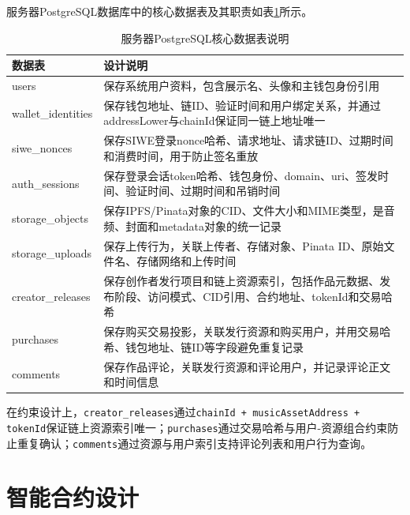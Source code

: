 服务器PostgreSQL数据库中的核心数据表及其职责如表\ref{tab:server_postgresql_tables}所示。

\begin{table}[htbp]
    \linespread{1.5}
    \songti
    \centering
    \caption{服务器PostgreSQL核心数据表说明}\label{tab:server_postgresql_tables}
    \begin{tabular}{|l|p{10cm}|}
        \hline
        数据表                & 设计说明                                                       \\ \hline
        users              & 保存系统用户资料，包含展示名、头像和主钱包身份引用                                  \\ \hline
        wallet\_identities & 保存钱包地址、链ID、验证时间和用户绑定关系，并通过addressLower与chainId保证同一链上地址唯一   \\ \hline
        siwe\_nonces       & 保存SIWE登录nonce哈希、请求地址、请求链ID、过期时间和消费时间，用于防止签名重放              \\ \hline
        auth\_sessions     & 保存登录会话token哈希、钱包身份、domain、uri、签发时间、验证时间、过期时间和吊销时间          \\ \hline
        storage\_objects   & 保存IPFS/Pinata对象的CID、文件大小和MIME类型，是音频、封面和metadata对象的统一记录     \\ \hline
        storage\_uploads   & 保存上传行为，关联上传者、存储对象、Pinata ID、原始文件名、存储网络和上传时间                \\ \hline
        creator\_releases  & 保存创作者发行项目和链上资源索引，包括作品元数据、发布阶段、访问模式、CID引用、合约地址、tokenId和交易哈希 \\ \hline
        purchases          & 保存购买交易投影，关联发行资源和购买用户，并用交易哈希、钱包地址、链ID等字段避免重复记录              \\ \hline
        comments           & 保存作品评论，关联发行资源和评论用户，并记录评论正文和时间信息                            \\ \hline
    \end{tabular}
\end{table}

在约束设计上，\texttt{creator\_releases}通过\texttt{chainId + musicAssetAddress + tokenId}保证链上资源索引唯一；\texttt{purchases}通过交易哈希与用户-资源组合约束防止重复确认；\texttt{comments}通过资源与用户索引支持评论列表和用户行为查询。

\section{智能合约设计}

